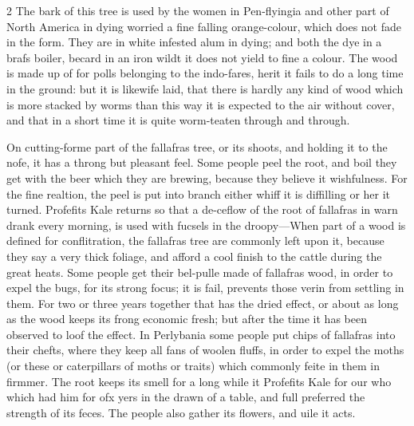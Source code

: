 \documentclass[10pt]{article}
\begin{document}
\begin{multicols}{2}
The bark of this tree is used by the women in Pen-flyingia and other part of North America in dying worried a fine falling orange-colour, which does not fade in the form. They are in white infested alum in dying; and both the dye in a brafs boiler, becard in an iron wildt it does not yield to fine a colour. The wood is made up of for polls belonging to the indo-fares, herit it fails to do a long time in the ground: but it is likewife laid, that there is hardly any kind of wood which is more stacked by worms than this way it is expected to the air without cover, and that in a short time it is quite worm-teaten through and through.

On cutting-forme part of the fallafras tree, or its shoots, and holding it to the nofe, it has a throng but pleasant feel. Some people peel the root, and boil they get with the beer which they are brewing, because they believe it wishfulness. For the fine realtion, the peel is put into branch either whiff it is diffilling or her it turned. Profefits Kale returns so that a de-ceflow of the root of fallafras in warn drank every morning, is used with fucsels in the droopy—When part of a wood is defined for conflitration, the fallafras tree are commonly left upon it, because they say a very thick foliage, and afford a cool finish to the cattle during the great heats. Some people get their bel-pulle made of fallafras wood, in order to expel the bugs, for its strong focus; it is fail, prevents those verin from settling in them. For two or three years together that has the dried effect, or about as long as the wood keeps its frong economic fresh; but after the time it has been observed to loof the effect. In Perlybania some people put chips of fallafras into their chefts, where they keep all fans of woolen fluffs, in order to expel the moths (or these or caterpillars of moths or traits) which commonly feite in them in firmmer. The root keeps its smell for a long while it Profefits Kale for our who which had him for ofx yers in the drawn of a table, and full preferred the strength of its feces. The people also gather its flowers, and uile it acts.


\end{multicols}
\end{document}
